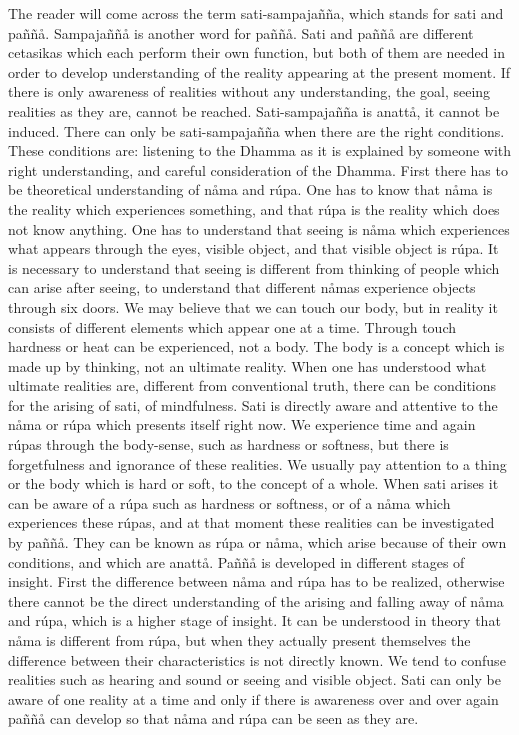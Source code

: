 \documentclass[12pt,twoside]{article}
\begin{document}
The reader will come across the term sati{}-sampaja\~n\~na, which stands
for sati and pa\~n\~n{\aa}. Sampaja\~n\~n{\aa} is another word for
pa\~n\~n{\aa}. Sati and pa\~n\~n{\aa} are different cetasikas which
each perform their own function, but both of them are needed in order
to develop understanding of the reality appearing at the present
moment. If there is only awareness of realities without any
understanding, the goal, seeing realities as they are, cannot be
reached. Sati{}-sampaja\~n\~na is anatt{\aa}, it cannot be induced.
There can only be sati{}-sampaja\~n\~na when there are the right
conditions. These conditions are: listening to the Dhamma as it is
explained by someone with right understanding, and careful
consideration of the Dhamma. First there has to be theoretical
understanding of n{\aa}ma and r\'upa. One has to know that n{\aa}ma is
the reality which experiences something, and that r\'upa is the reality
which does not know anything. One has to understand that seeing is
n{\aa}ma which experiences what appears through the eyes, visible
object, and that visible object is r\'upa. It is necessary to
understand that seeing is different from thinking of people which can
arise after seeing, to understand that different n{\aa}mas experience
objects through six doors. We may believe that we can touch our body,
but in reality it consists of different elements which appear one at a
time. Through touch hardness or heat can be experienced, not a body.
The body is a concept which is made up by thinking, not an ultimate
reality. When one has understood what ultimate realities are, different
from conventional truth, there can be conditions for the arising of
sati, of mindfulness. Sati is directly aware and attentive to the
n{\aa}ma or r\'upa which presents itself right now. We experience time
and again r\'upas through the body{}-sense, such as hardness or
softness, but there is forgetfulness and ignorance of these realities.
We usually pay attention to a thing or the body which is hard or soft,
to the concept of a
{\textasciigrave}{\textasciigrave}whole{\textquotesingle}{\textquotesingle}.
When sati arises it can be aware of a r\'upa such as hardness or
softness, or of a n{\aa}ma which experiences these r\'upas, and at that
moment these realities can be investigated by pa\~n\~n{\aa}. They can
be known as r\'upa or n{\aa}ma, which arise because of their own
conditions, and which are anatt{\aa}. Pa\~n\~n{\aa} is developed in
different stages of insight. First the difference between n{\aa}ma and
r\'upa has to be realized, otherwise there cannot be the direct
understanding of the arising and falling away of n{\aa}ma and r\'upa,
which is a higher stage of insight. It can be understood in theory that
n{\aa}ma is different from r\'upa, but when they actually present
themselves the difference between their characteristics is not directly
known. We tend to confuse realities such as hearing and sound or seeing
and visible object. Sati can only be aware of one reality at a time and
only if there is awareness over and over again pa\~n\~n{\aa} can
develop so that n{\aa}ma and r\'upa can be seen as they are. 
\end{document}

